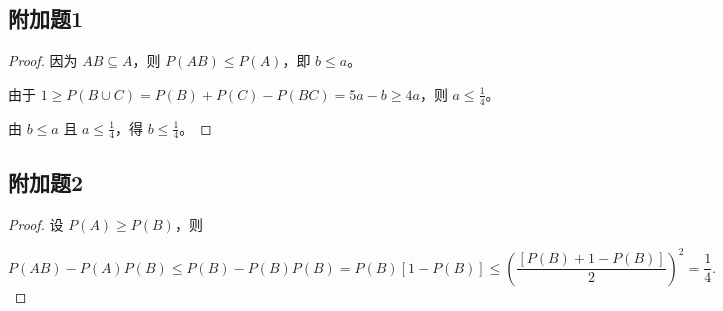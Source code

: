 \documentclass[twoside]{article}
\begin{document}
\subsection{附加题1}

\begin{proof}
    
    因为 $AB \subseteq A$，则 $P(AB) \leq P(A)$，即 $b \leq a$。

    由于 $1 \geq P(B \cup C) = P(B) + P(C) - P(BC) = 5a - b \geq 4a$，则 $a \leq \frac{1}{4}$。
    
    由 $b \leq a$ 且 $a \leq \frac{1}{4}$，得 $b \leq \frac{1}{4}$。

\end{proof}

\subsection{附加题2}

\begin{proof}

\noindent
设 $P(A) \geq P(B)$，则

\[
P(AB) - P(A)P(B) \leq P(B) - P(B)P(B) = P(B)[1 - P(B)] \leq (\frac{[P(B) + 1 - P(B)]}{2})^2 = \frac{1}{4}.
\]

\end{proof}
\newpage{}
\end{document}

